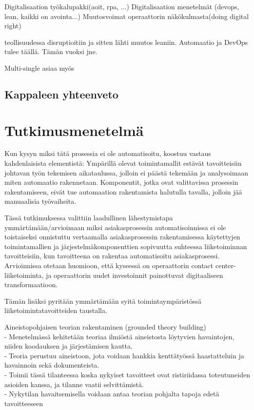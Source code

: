 \documentclass[finnish,12pt,a4paper,pdftex]{article}
\begin{document}
Digitalisaation työkalupakki(aoit, rpa, ...)
Digitalisaation menetelmät (devops, lean, kaikki on avointa...)
Muutosvoimat operaattorin näkökulmasta(doing digital right)



teollisuudessa disruptioitiin ja sitten lähti muutos leaniin.
Automaatio ja DevOps tulee täällä. Tämän vuoksi jne.

Multi-single asiaa myös


\subsection{Kappaleen yhteenveto}

\clearpage

\section{Tutkimusmenetelmä}

Kun kysyn miksi tätä prosessia ei ole automatisoitu, koostuu vastaus kahdenlaisista elementistä: Ympärillä olevat toimintamallit estävät tavoitteisiin johtavan työn tekemisen aikataulussa, jolloin ei päästä tekemään ja analysoimaan miten automaatio rakennetaan. Komponentit, jotka ovat valittavissa prosessin rakentamiseen, eivät tue automaation rakentamista halutulla tavalla, jolloin jää manuaalisia työvaiheita.

Tässä tutkimuksessa valittiin laadullinen lähestymistapa ymmärtämään/arvioimaan miksi asiakasprosessin automatisoinnissa ei ole toistaiseksi onnistuttu vertaamalla asiakasprosessin rakentamisessa käytettyjen toimintamallien ja järjestelmäkomponenttien sopivuutta suhteessa liiketoiminnan tavoitteisiin, kun tavoitteena on rakentaa automatisoitu asiakasprosessi. Arvioinnissa otetaan huomioon, että kyseessä on operaattorin contact center-liiketoiminta, ja operaattorin uudet investoinnit painottuvat digitaaliseen transformaatioon. 

Tämän lisäksi pyritään ymmärtämään syitä toimintaympäristössä liiketoimintatavoitteiden taustalla. 

Aineistopohjaisen teorian rakentaminen (grounded theory building)\\
- Menetelmässä kehitetään teoriaa ilmiöstä aineistosta löytyvien havaintojen, niiden koodauksen ja järjestämisen kautta.\\
- Teoria perustuu aineistoon, jota voidaan hankkia kenttätyössä haastatteluin ja havainnoin sekä dokumenteista.\\
- Toimii tässä tilanteessa koska nykyiset tavoitteet ovat ristiriidassa toteutuneiden asioiden kanssa, ja tilanne vaatii selvittämistä.\\
- Nykytilan havaitsemisella voidaan antaa teorian pohjalta tapoja edetä tavoitteeseen\\
\end{document}
